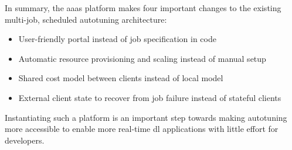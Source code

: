 In summary, the \gls{aaas} platform makes four important changes to the existing multi-job, scheduled autotuning architecture:
\begin{itemize}
	\item User-friendly portal instead of job specification in code
	\item Automatic resource provisioning and scaling instead of manual setup
	\item Shared cost model between clients instead of local model
	\item External client state to recover from job failure instead of stateful clients
\end{itemize}
Instantiating such a platform is an important step towards making autotuning more accessible to enable more real-time \gls{dl} applications with little effort for developers.